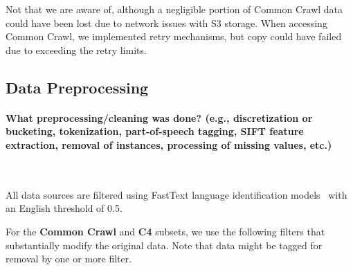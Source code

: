 \documentclass{article}
\begin{document}
Not that we are aware of, although a negligible portion of Common Crawl data could have been lost due to network issues with S3 storage. 
When accessing Common Crawl, we implemented retry mechanisms, but copy could have failed due to exceeding the retry limits. 

\subsection{Data Preprocessing}
\label{datasheet:processing}

\paragraph{What preprocessing/cleaning was done? (e.g., discretization or bucketing, tokenization, part-of-speech tagging, SIFT feature extraction, removal of instances, processing of missing values, etc.)}~

All data sources are filtered using FastText language identification models~\citep{joulin2016fasttext,joulin2016bag} with an English threshold of 0.5.

For the \textbf{Common Crawl} and \textbf{C4} subsets, we use the following filters that substantially modify the original data. 
Note that data might be tagged for removal by one or more filter.
\end{document}
